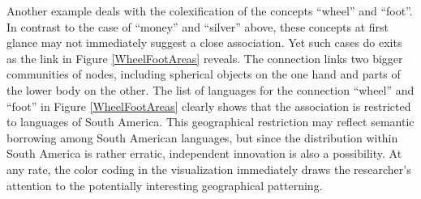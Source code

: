 Another example deals with the colexification of the concepts ``wheel'' and ``foot''. In contrast to the case of ``money'' and ``silver'' above, these concepts at first glance may not immediately suggest a close association. Yet such cases do exits as the link in Figure \ref{WheelFootAreas} reveals. The connection links two bigger communities of nodes, including spherical objects on the one hand and parts of the lower body on the other. The list of languages for the connection ``wheel'' and ``foot'' in Figure \ref{WheelFootAreas} clearly shows that the association is restricted to languages of South America. 
This geographical restriction may reflect semantic borrowing among South American languages, but since the distribution within South America is rather erratic, independent innovation is also a possibility. At any rate, the color coding in the visualization immediately draws the researcher's attention to the potentially interesting geographical patterning.




